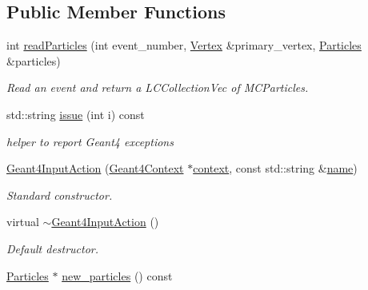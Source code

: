 \subsection*{Public Member Functions}
\begin{DoxyCompactItemize}
\item 
int \hyperlink{class_d_d4hep_1_1_simulation_1_1_geant4_input_action_acaa33515bc305aacd8c6ad5f8c2f0b0c}{read\+Particles} (int event\+\_\+number, \hyperlink{class_d_d4hep_1_1_simulation_1_1_geant4_input_action_a0bcc23935dc55574b02d9ee4514eabc8}{Vertex} \&primary\+\_\+vertex, \hyperlink{class_d_d4hep_1_1_simulation_1_1_geant4_input_action_ae62b1f5e1be390991dd228e7bb7bcc04}{Particles} \&particles)
\begin{DoxyCompactList}\small\item\em Read an event and return a L\+C\+Collection\+Vec of M\+C\+Particles. \end{DoxyCompactList}\item 
std\+::string \hyperlink{class_d_d4hep_1_1_simulation_1_1_geant4_input_action_aba4e9d3b1920ac606dab94d58ac86d12}{issue} (int i) const
\begin{DoxyCompactList}\small\item\em helper to report Geant4 exceptions \end{DoxyCompactList}\item 
\hyperlink{class_d_d4hep_1_1_simulation_1_1_geant4_input_action_aad1080ace361ad63f71dd53bc7b01580}{Geant4\+Input\+Action} (\hyperlink{class_d_d4hep_1_1_simulation_1_1_geant4_context}{Geant4\+Context} $\ast$\hyperlink{class_d_d4hep_1_1_simulation_1_1_geant4_action_aa9d87f0ec2a72b7fc2591b18f98d75cf}{context}, const std\+::string \&\hyperlink{class_d_d4hep_1_1_simulation_1_1_geant4_action_af374e70b014d16afb81dd9d77cc3894b}{name})
\begin{DoxyCompactList}\small\item\em Standard constructor. \end{DoxyCompactList}\item 
virtual \hyperlink{class_d_d4hep_1_1_simulation_1_1_geant4_input_action_a82b07efc96d11b7dfacb36c718d41c26}{$\sim$\+Geant4\+Input\+Action} ()
\begin{DoxyCompactList}\small\item\em Default destructor. \end{DoxyCompactList}\item 
\hyperlink{class_d_d4hep_1_1_simulation_1_1_geant4_input_action_ae62b1f5e1be390991dd228e7bb7bcc04}{Particles} $\ast$ \hyperlink{class_d_d4hep_1_1_simulation_1_1_geant4_input_action_a965cd9f84349ce4189191e263091a859}{new\+\_\+particles} () const

\end{DoxyCompactItemize}
